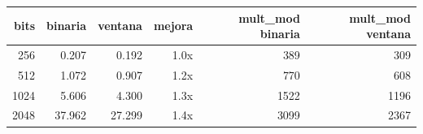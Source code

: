 \begin{tabular}{rrrrrr}
\toprule
bits & binaria & ventana & mejora & mult\_mod binaria & mult\_mod ventana \\
\midrule
256 & 0.207 & 0.192 & 1.0x & 389 & 309 \\
512 & 1.072 & 0.907 & 1.2x & 770 & 608 \\
1024 & 5.606 & 4.300 & 1.3x & 1522 & 1196 \\
2048 & 37.962 & 27.299 & 1.4x & 3099 & 2367 \\
\bottomrule
\end{tabular}
